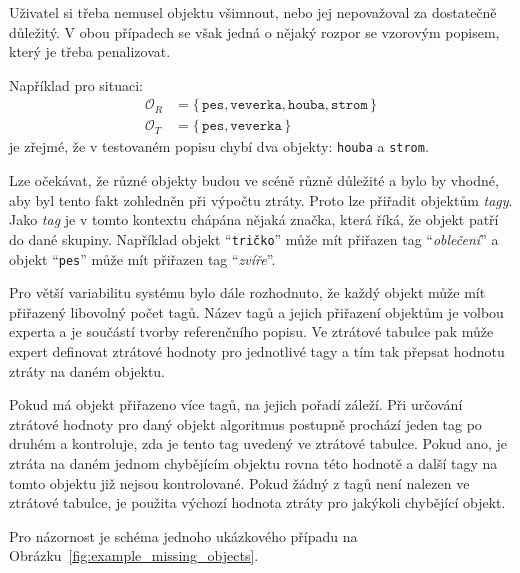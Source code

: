 Uživatel si třeba nemusel objektu všimnout, nebo jej nepovažoval za dostatečně důležitý.
V obou případech se však jedná o nějaký rozpor se vzorovým popisem, který je třeba penalizovat.

Například pro situaci:
\begin{align*}
	\mathcal{O}_{R} & = \bigl\{\, \texttt{pes}, \texttt{veverka}, \texttt{houba}, \texttt{strom}\, \bigr\} \\
	\mathcal{O}_{T} & = \bigl\{\, \texttt{pes}, \texttt{veverka}\, \bigr\}
\end{align*}
je zřejmé, že v testovaném popisu chybí dva objekty: \texttt{houba} a \texttt{strom}.

Lze očekávat, že různé objekty budou ve scéně různě důležité a bylo by vhodné, aby byl tento fakt zohledněn při výpočtu ztráty.
Proto lze přiřadit objektům \emph{tagy}.
Jako \emph{tag} je v tomto kontextu chápána nějaká značka, která říká, že objekt patří do dané skupiny.
Například objekt \enquote{\texttt{tričko}} může mít přiřazen tag \enquote{\emph{oblečení}} a objekt \enquote{\texttt{pes}}
může mít přiřazen tag \enquote{\emph{zvíře}}.

Pro větší variabilitu systému bylo dále rozhodnuto, že každý objekt může mít přiřazený libovolný počet tagů.
Název tagů a jejich přiřazení objektům je volbou experta a je součástí tvorby referenčního popisu.
Ve ztrátové tabulce pak může expert definovat ztrátové hodnoty pro jednotlivé tagy a tím tak přepsat hodnotu ztráty na daném objektu.

Pokud má objekt přiřazeno více tagů, na jejich pořadí záleží.
Při určování ztrátové hodnoty pro daný objekt algoritmus postupně prochází jeden tag po druhém a kontroluje, zda je tento tag uvedený ve ztrátové tabulce.
Pokud ano, je ztráta na daném jednom chybějícím objektu rovna této hodnotě a další tagy na tomto objektu již nejsou kontrolované.
Pokud žádný z tagů není nalezen ve ztrátové tabulce, je použita výchozí hodnota ztráty pro jakýkoli chybějící objekt.

Pro názornost je schéma jednoho ukázkového případu na Obrázku~\ref{fig:example_missing_objects}.

\def\objone{míč}
\def\objtwo{chleba}
\def\objthree{pes}
\def\objfour{strom}
\def\objfive{kuře}
\def\objsix{mrkev}
\def\objseven{jahoda}
\def\objeight{kapr}
\def\tagone{jídlo}
\def\tagtwo{zvíře}
\def\tagthree{rostlina}

